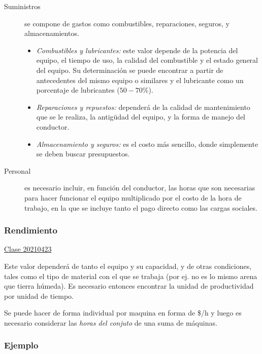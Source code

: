 \documentclass[../main.tex]{subfiles}
\begin{document}
\begin{description}
  \item[Suministros] se compone de gastos como combustibles, reparaciones, seguros,
    y almacenamientos.
    \begin{itemize}
      \item \textit{Combustibles y lubricantes:} este valor depende de la potencia
        del equipo, el tiempo de uso, la calidad del combustible y el estado
        general del equipo. Su determinación se puede encontrar a partir de 
        antecedentes del mismo equipo o similares y el lubricante como un 
        porcentaje de lubricantes ($50-70\%$).
        
       \item \textit{Reparaciones y repuestos:} dependerá de la calidad de
         mantenimiento que se le realiza, la antigüdad del equipo, y la forma de
         manejo del conductor.
         
        \item \textit{Almacenamiento y seguros:} es el costo más sencillo, donde
          simplemente se deben buscar presupuestos.
    \end{itemize}
    \item[Personal] es necesario incluir, en función del conductor, las horas que
      son necesarias para hacer funcionar el equipo multiplicado por el costo de
      la hora de trabajo, en la que se incluye tanto el pago directo como las
      cargas sociales.
\end{description}


\subsubsection{Rendimiento}

\href{https://youtu.be/3FCKbdYVABE}{Clase 20210423}

Este valor dependerá de tanto el equipo y su capacidad, y de otras condiciones,
tales como el tipo de material con el que se trabaja (por ej. no es lo mismo arena
que tierra húmeda). Es necesario entonces encontrar la unidad de productividad 
por unidad de tiempo.

Se puede hacer de forma individual por maquina en forma de \$/h y luego es necesario
considerar las  \textit{horas del conjuto} de una suma de máquinas.

\subsubsection{Ejemplo}
\end{document}
